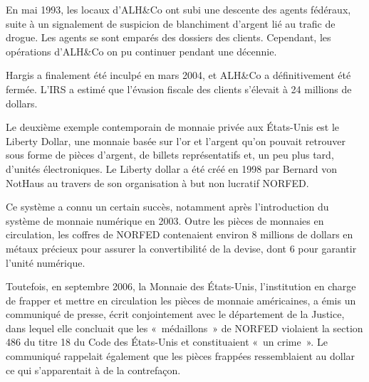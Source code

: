 En mai 1993, les locaux d'ALH\&Co ont subi une descente des agents fédéraux, suite à un signalement de suspicion de blanchiment d'argent lié au trafic de drogue. Les agents se sont emparés des dossiers des clients. Cependant, les opérations d'ALH\&Co on pu continuer pendant une décennie.

Hargis a finalement été inculpé en mars 2004, et ALH\&Co a définitivement été fermée. L'IRS a estimé que l'évasion fiscale des clients s'élevait à 24 millions de dollars.


Le deuxième exemple contemporain de monnaie privée aux États-Unis est le Liberty Dollar, une monnaie basée sur l'or et l'argent qu'on pouvait retrouver sous forme de pièces d'argent, de billets représentatifs et, un peu plus tard, d'unités électroniques. Le Liberty dollar a été créé en 1998 par Bernard von NotHaus au travers de son organisation à but non lucratif NORFED.

Ce système a connu un certain succès, notamment après l'introduction du système de monnaie numérique en 2003. Outre les pièces de monnaies en circulation, les coffres de NORFED contenaient environ 8 millions de dollars en métaux précieux pour assurer la convertibilité de la devise, dont 6 pour garantir l'unité numérique.

Toutefois, en septembre 2006, la Monnaie des États-Unis, l'institution en charge de frapper et mettre en circulation les pièces de monnaie américaines, a émis un communiqué de presse, écrit conjointement avec le département de la Justice, dans lequel elle concluait que les «~médaillons~» de NORFED violaient la section 486 du titre 18 du Code des États-Unis et constituaient «~un crime~». Le communiqué rappelait également que les pièces frappées ressemblaient au dollar ce qui s'apparentait à de la contrefaçon.

